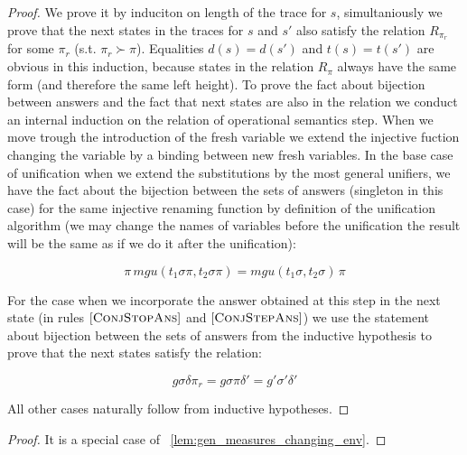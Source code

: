 \begin{proof}
We prove it by induciton on length of the trace for $s$, simultaniously we prove that the next states in the traces for $s$ and $s'$ also satisfy the relation $R_{\pi_r}$ for some $\pi_r$ (s.t. $\pi_r \succ \pi$). Equalities $d(s) = d(s')$ and $t(s) = t(s')$ are obvious in this induction, because states in the relation $R_{\pi}$ always have the same form (and therefore the same left height). To prove the fact about bijection between answers and the fact that next states are also in the relation we conduct an internal induction on the relation of operational semantics step. When we move trough the introduction of the fresh variable we extend the injective fuction changing the variable by a binding between new fresh variables. In the base case of unification when we extend the substitutions by the most general unifiers, we have the fact about the bijection between the sets of answers (singleton in this case) for the same injective renaming function by definition of the unification algorithm (we may change the names of variables before the unification the result will be the same as if we do it after the unification):

\[ \pi \, mgu(t_1 \sigma \pi, t_2 \sigma \pi) = mgu(t_1 \sigma, t_2 \sigma) \, \pi  \]

For the case when we incorporate the answer obtained at this step in the next state (in rules $\mbox{[\textsc{ConjStopAns}]} $ and $\mbox{[\textsc{ConjStepAns}]}$) we use the statement about bijection between the sets of answers from the inductive hypothesis to prove that the next states satisfy the relation:

\[ g \sigma \delta \pi_r = g \sigma \pi \delta' = g' \sigma' \delta'  \] 

All other cases naturally follow from inductive hypotheses.

\end{proof}

\begin{proof}
It is a special case of \lemmaword~\ref{lem:gen_measures_changing_env}.
\end{proof}

